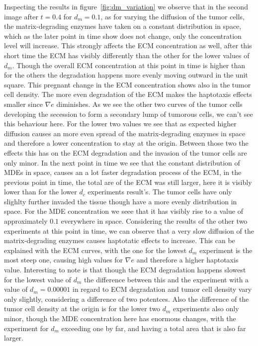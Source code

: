 Inspecting the results in figure~\ref{fig:dm_variation} we observe that in the second image after $t=0.4$ for $d_m=0.1$, as for varying the diffusion of the tumor cells, the matrix-degrading enzymes have taken on a constant distribution in space, which as the later point in time show does not change, only the concentration level will increase. This strongly affects the ECM concentration as well, after this short time the ECM has visibly differently than the other for the lower values of $d_m$. Though the overall ECM concentration at this point in time is higher than for the others the degradation happens more evenly moving outward in the unit square. This pregnant change in the ECM concentration shows also in the tumor cell density. The more even degradation of the ECM makes the haptotaxis effects smaller since $\nabla e$ diminishes. As we see the other two curves of the tumor cells developing the secession to form a secondary lump of tumorous cells, we can't see this behaviour here.
For the lower two values we see that as expected higher diffusion causes an more even spread of the matrix-degrading enzymes in space and therefore a lower concentration to stay at the origin. Between those two the effects this has on the ECM degradation and the invasion of the tumor cells are only minor. \newline 
In the next point in time we see that the constant distribution of MDEs in space, causes an a lot faster degradation process of the ECM, in the previous point in time, the total are of the ECM was still larger, here it is visibly lower than for the lower $d_c$ experiments result's. The tumor cells have only slighlty further invaded the tissue though have a more evenly distribution in space. For the MDE concentration we seee that it has visibly rise to a value of approximately $0.1$ everywhere in space. 
Considering the results of the other two experiments at this point in time, we can observe that a very slow diffusion of the matrix-degrading enzymes causes haptotatic effects to increase. This can be explained with the ECM curves, with the one for the lowest $d_m$ experiment is the most steep one, causing high values for $\nabla e$ and therefore a higher haptotaxis value. Interesting to note is that though the ECM degradation happens slowest for the lowest value of $d_m$ the difference between this and the experiment with a value of $d_m=0.00001$ in regard to ECM degradation and tumor cell density vary only slightly, considering a difference of two potentces. Also the difference of the tumor cell density at the origin is for the lower two $d_m$ experiments also only minor, though the MDE concentration here has enormous changes, with the experiment for $d_m$ exceeding one by far, and having a total area that is also far larger. \newline 

